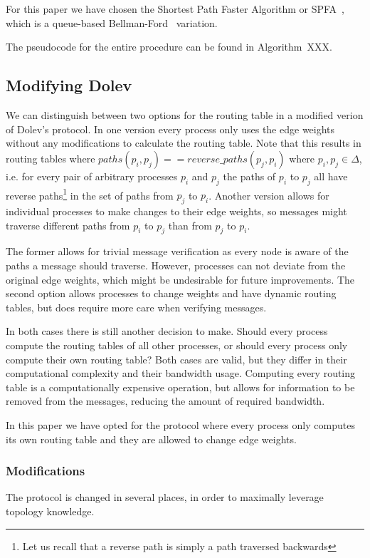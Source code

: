 For this paper we have chosen the Shortest Path Faster Algorithm or SPFA~\cite{spfa-moore,spfa-fanding}, which is a queue-based Bellman-Ford~\cite{bf-bellman,bf-ford} variation.

The pseudocode for the entire procedure can be found in Algorithm~XXX.

\subsection{Modifying Dolev}
We can distinguish between two options for the routing table in a modified verion of Dolev's protocol. 
In one version every process only uses the edge weights without any modifications to calculate the routing table. Note that this results in routing tables where $paths(p_i, p_j) == reverse\_paths(p_j, p_i)$ where $p_i, p_j \in \Delta$, i.e. for every pair of arbitrary processes $p_i$ and $p_j$ the paths of $p_i$ to $p_j$ all have reverse paths\footnote{Let us recall that a reverse path is simply a path traversed backwards} in the set of paths from $p_j$ to $p_i$.
Another version allows for individual processes to make changes to their edge weights, so messages might traverse different paths from $p_i$ to $p_j$ than from $p_j$ to $p_i$.

The former allows for trivial message verification as every node is aware of the paths a message should traverse. However, processes can not deviate from the original edge weights, which might be undesirable for future improvements. The second option allows processes to change weights and have dynamic routing tables, but does require more care when verifying messages.

In both cases there is still another decision to make. Should every process compute the routing tables of all other processes, or should every process only compute their own routing table? Both cases are valid, but they differ in their computational complexity and their bandwidth usage. Computing every routing table is a computationally expensive operation, but allows for information to be removed from the messages, reducing the amount of required bandwidth.

In this paper we have opted for the protocol where every process only computes its own routing table and they are allowed to change edge weights.

\subsubsection{Modifications}
The protocol is changed in several places, in order to maximally leverage topology knowledge. 


